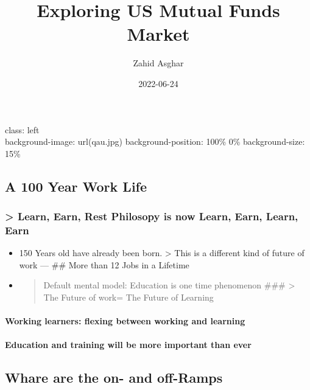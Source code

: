 \documentclass[]{tufte-handout}
\title[Growth vs Value Funds Investment]{Exploring US Mutual Funds
Market}
\author{Zahid Asghar}
\date{2022-06-24}
\begin{document}
\maketitle




class: left\\
background-image: url(qau.jpg) background-position: 100\% 0\%
background-size: 15\%

\hypertarget{a-100-year-work-life}{%
\subsection{A 100 Year Work Life}\label{a-100-year-work-life}}

\hypertarget{learn-earn-rest-philosopy-is-now-learn-earn-learn-earn}{%
\subsubsection{\textgreater{} Learn, Earn, Rest Philosopy is now Learn,
Earn, Learn,
Earn}\label{learn-earn-rest-philosopy-is-now-learn-earn-learn-earn}}

\begin{itemize}
\item
  150 Years old have already been born. \textgreater{} This is a
  different kind of future of work --- \#\# More than 12 Jobs in a
  Lifetime
\item
  \begin{quote}
  Default mental model: Education is one time phenomenon \#\#\#
  \textgreater{} The Future of work= The Future of Learning
  \end{quote}
\end{itemize}

\hypertarget{working-learners-flexing-between-working-and-learning}{%
\paragraph{Working learners: flexing between working and
learning}\label{working-learners-flexing-between-working-and-learning}}

\hypertarget{education-and-training-will-be-more-important-than-ever}{%
\paragraph{Education and training will be more important than
ever}\label{education-and-training-will-be-more-important-than-ever}}

\hypertarget{whare-are-the-on--and-off-ramps}{%
\subsection{Whare are the on- and
off-Ramps}\label{whare-are-the-on--and-off-ramps}}
\end{document}
